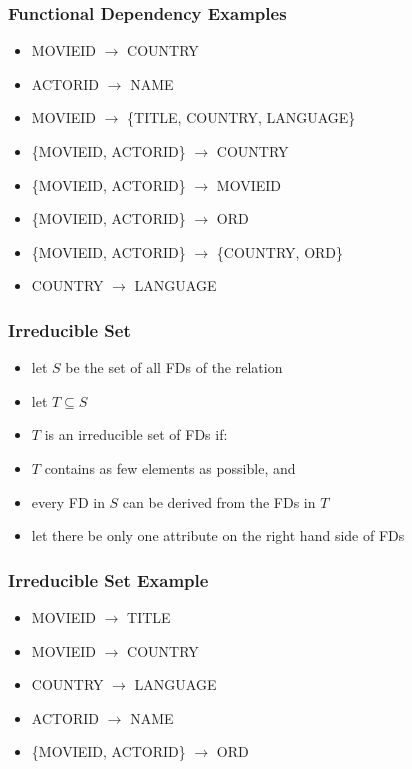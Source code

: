 \documentclass[dvipsnames]{beamer}
\begin{document}
\begin{frame}
  \frametitle{Functional Dependency Examples}

  \begin{itemize}
    \item MOVIEID $\rightarrow$ COUNTRY
    \item ACTORID $\rightarrow$ NAME

    \pause
    \item MOVIEID $\rightarrow$ \{TITLE, COUNTRY, LANGUAGE\}

    \pause
    \item \{MOVIEID, ACTORID\} $\rightarrow$ COUNTRY
    \item \{MOVIEID, ACTORID\} $\rightarrow$ MOVIEID

    \pause
    \item \{MOVIEID, ACTORID\} $\rightarrow$ ORD

    \pause
    \item \{MOVIEID, ACTORID\} $\rightarrow$ \{COUNTRY, ORD\}

    \pause
    \item COUNTRY $\rightarrow$ LANGUAGE
  \end{itemize}
\end{frame}

\begin{frame}
  \frametitle{Irreducible Set}

  \begin{itemize}
    \item let $S$ be the set of all FDs of the relation
    \item let $T \subseteq S$

    \medskip
    \item $T$ is an irreducible set of FDs if:

    \smallskip
    \item $T$ contains as few elements as possible, and
    \item every FD in $S$ can be derived from the FDs in $T$

    \pause
    \medskip
    \item let there be only one attribute on the right hand side of FDs
  \end{itemize}
\end{frame}

\begin{frame}
  \frametitle{Irreducible Set Example}

  \begin{itemize}
    \item MOVIEID $\rightarrow$ TITLE
    \item MOVIEID $\rightarrow$ COUNTRY
    \item COUNTRY $\rightarrow$ LANGUAGE
    \item ACTORID $\rightarrow$ NAME
    \item \{MOVIEID, ACTORID\} $\rightarrow$ ORD
  \end{itemize}
\end{frame}
\end{document}
